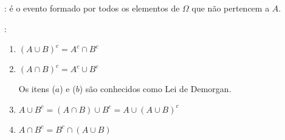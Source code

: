 \begin{description}
    \begin{figure}[H]
      \centering
      
      \caption{}
      \label{fig:5}
    \end{figure}
  \item [Evento Complementar ($\bar{A}$ ou $A^c$)]: é o evento formado por todos os elementos de $\Omega$ que não pertencem a $A$.
    \begin{description}
      \begin{figure}[H]
        \centering
        
        \caption{}
        \label{fig:6}
      \end{figure}

    \item [Alguns exemplos de eventos complementares]: 

      \begin{enumerate}[align=left,label=({\alph*}) ]

        \item $(A \cup B )^c = A^c \cap B^c$
          \begin{figure}[H]
            \centering
            
            \caption{}
            \label{figa:7}
          \end{figure}

        \item $(A \cap B)^c = A^c \cup B^c $
          \begin{figure}[H]
            \centering
            
            \caption{}
            \label{figura:8}
          \end{figure}

          Os itens ($a$) e ($b$) são conhecidos como Lei de Demorgan.
        \item $A \cup B^c = ( A \cap B ) \cup B^c = A \cup (A \cup B)^c$
          \begin{figure}[H]
            \centering
            
            \caption{}
            \label{figura:9}

          \end{figure}

        \item  $A \cap B^c = B^c \cap (A \cup B)$
          \begin{figure}[H]
            \centering
            
            \caption{}
            \label{fig:10}
          \end{figure}


\end{enumerate}
\end{description}
\end{description}
